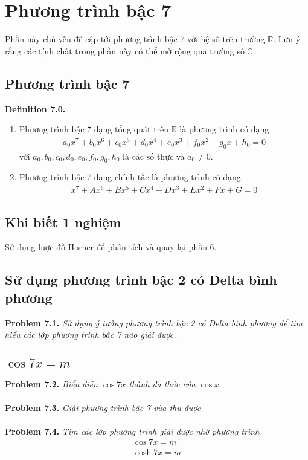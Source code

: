 \documentclass[a4paper,oneside]{book}
\numberwithin{equation}{chapter}
\begin{document}
\chapter{Phương trình bậc 7}
Phần này chủ yếu đề cập tới phương trình bậc 7 với hệ số trên trường $\mathbb{R}$. Lưu ý rằng các tính chất trong phần này có thể mở rộng qua trường số $\mathbb{C}$
\section{Phương trình bậc 7}
\textbf{Definition 7.0.} 
\begin{enumerate}
\item Phương trình bậc 7 dạng tổng quát trên $\mathbb{R}$ là phương trình có dạng
\begin{align}
{a_0}{x^7} + {b_0}{x^6} + {c_0}{x^5} + {d_0}x^4 + {e_0}x^3+f_0x^2 +g_0x+h_0 = 0
\end{align}
với $a_0,b_0,c_0,d_0,e_0,f_0,g_0,h_0$ là các số thực và $a_0 \ne 0$.
\item Phương trình bậc 7 dạng chính tắc là phương trình có dạng
\begin{align}
{x^7} + A{x^6} + B{x^5} + C{x^4} + D{x^3} + E{x^2} + Fx + G = 0
\end{align}

\end{enumerate}

\section{Khi biết 1 nghiệm}
Sử dụng lược đồ Horner để phân tích và quay lại phần 6.
\section{Sử dụng phương trình bậc 2 có Delta bình phương}
\textbf{Problem 7.1.} \textit{Sử dụng ý tưởng phương trình bậc 2 có Delta bình phương để tìm hiểu các lớp phương trình bậc 7 nào giải được.}
\section{$\cos 7x = m$}
\textbf{Problem 7.2.} \textit{Biểu diễn $\cos 7x$ thành đa thức của $\cos x$}\\
\\
\textbf{Problem 7.3.} \textit{Giải phương trình bậc 7 vừa thu được}\\
\\
\textbf{Problem 7.4.} \textit{Tìm các lớp phương trình giải được nhờ phương trình} 
\begin{align}
\cos 7x = m\\
\cosh 7x = m
\end{align}
\end{document}
